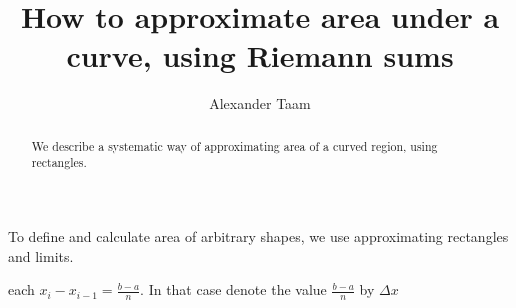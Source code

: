 \documentclass{ximera}
\title{How to approximate area under a curve, using Riemann sums}
\author{Alexander Taam}
\begin{document}
\begin{abstract}
  We describe a systematic way of approximating area of a curved region, using rectangles.
\end{abstract}
\maketitle

To define and calculate area of arbitrary shapes, we use approximating rectangles and limits.

\begin{definition}\label{def:partition}
\begin{foldable}
\begin{foldable}
each $x_i-x_{i-1}=\frac{b-a}{n}$. In that case denote the value $\frac{b-a}{n}$ by $\Delta x$
\end{foldable}
\end{foldable}
\end{definition}
\end{document}
